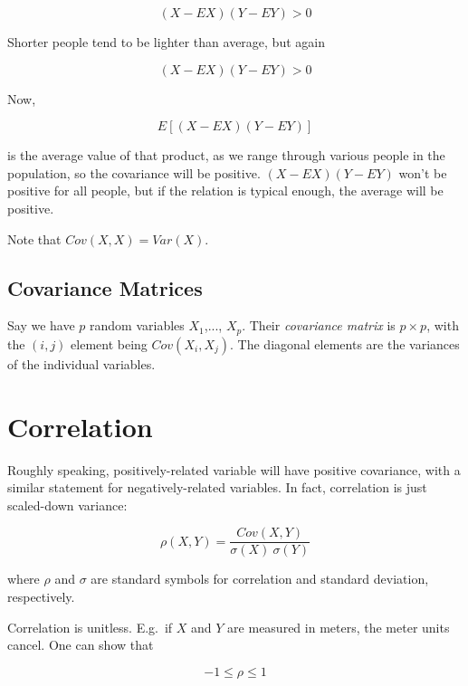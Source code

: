 \begin{equation}
(X - EX) (Y - EY) > 0
\end{equation}

Shorter people tend to be lighter than average, but again

\begin{equation}
(X - EX) (Y - EY) > 0
\end{equation}

Now, 

\begin{equation}
E[(X - EX) (Y - EY)]
\end{equation}

is the average value of that product, as we range through various people
in the population, so the covariance will be positive.  
$(X - EX) (Y - EY)$ won't be positive for all people, but if the
relation is typical enough, the average will be positive.

Note that $Cov(X,X) = Var(X)$.

\subsection{Covariance Matrices}

Say we have $p$ random variables $X_1$,..., $X_p$.  Their
\textit{covariance matrix} is $p \times p$, with the $(i,j)$
element being $Cov(X_i,X_j)$.  The diagonal elements are the variances
of the individual variables.

\section{Correlation}

Roughly speaking, positively-related variable will have
positive covariance, with a similar statement for negatively-related
variables.  In fact, correlation is just scaled-down variance:

\begin{equation}
\rho(X,Y) = 
\frac{Cov(X,Y)}{\sigma(X) ~ \sigma(Y)}
\end{equation}

where $\rho$ and $\sigma$ are standard symbols for correlation and
standard deviation, respectively.

Correlation is unitless.  E.g.\ if $X$ and $Y$ are measured in meters,
the meter units cancel.  One can show that 

\begin{equation}
\label{rho11}
-1 \leq \rho \leq 1
\end{equation}

